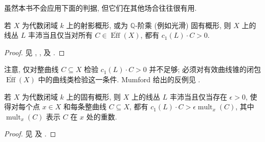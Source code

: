 \setlength{\emergencystretch}{2em}
虽然本书不会应用下面的判据, 但它们在其他场合往往很有用.
\begin{theorem}[Kleiman 判据]\label{src:B.2.29}
若 $X$ 为代数闭域 $k$ 上的射影概形, 或为 $\mathbb Q$-阶乘 (例如光滑) 固有概形, 则 $X$ 上的线丛 $L$ 丰沛当且仅当对所有 $C\in\overline{\operatorname{Eff}}(X)$, 都有 $c_1(L)\cdot C>0$.
\end{theorem}
\begin{proof}
见 \cite[\S III.$1$]{Kle66}, \cite[定理 VI.$2.19$]{Kol96}, \cite[定理 $1.18$]{KM98} 及 \cite[定理 $1.4.23$]{Laz04a}.
\end{proof}
注意, 仅对整曲线 $C\subseteq X$ 检验 $c_1(L)\cdot C>0$ 并不足够; 必须对有效曲线锥的闭包 $\overline{\operatorname{Eff}}(X)$ 中的曲线类检验这一条件. Mumford 给出的反例见 \cite[第 $50$--$56$ 页]{Har70}.
\begin{theorem}[Seshadri 判据]\label{src:B.2.30}
若 $X$ 为代数闭域 $k$ 上的固有概形, 则 $X$ 上的线丛 $L$ 丰沛当且仅当存在 $\epsilon>0$, 使得对每个点 $x\in X$ 和每条整曲线 $C\subseteq X$, 都有 $c_1(L)\cdot C>\epsilon\operatorname{mult}_x(C)$, 其中 $\operatorname{mult}_x(C)$ 表示 $C$ 在 $x$ 处的重数.
\end{theorem}
\begin{proof}
见 \cite[定理 $1.4.13$]{Laz04a} 及 \cite[定理 $2.18$]{Kol96}.
\end{proof}

